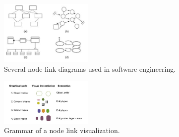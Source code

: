 \begin{mdframed}
\begin{multicols}{2}
    \begin{figure}[H]
        \centering
        \includegraphics[width=0.4\textwidth]{node_link_vis.png}
        \caption{Several node-link diagrams used in software engineering.}
    \end{figure}
    \begin{figure}[H]
        \centering
        \includegraphics[width=0.4\textwidth]{node_link_grammar.png}
        \caption{Grammar of a node link visualization.}
    \end{figure}

\end{multicols}
\end{mdframed}


